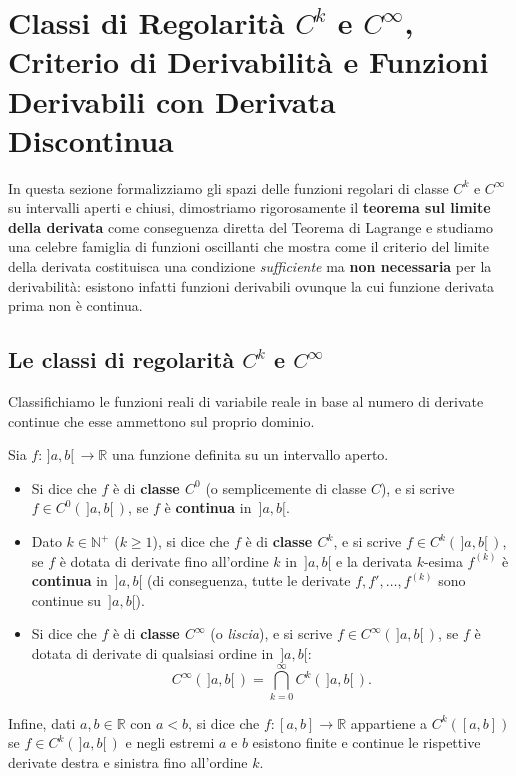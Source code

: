 \section{Classi di Regolarità $C^k$ e $C^\infty$, Criterio di Derivabilità e Funzioni Derivabili con Derivata Discontinua}

In questa sezione formalizziamo gli spazi delle funzioni regolari di classe $C^k$ e $C^\infty$ su intervalli aperti e chiusi, dimostriamo rigorosamente il \textbf{teorema sul limite della derivata} come conseguenza diretta del Teorema di Lagrange e studiamo una celebre famiglia di funzioni oscillanti che mostra come il criterio del limite della derivata costituisca una condizione \emph{sufficiente} ma \textbf{non necessaria} per la derivabilità: esistono infatti funzioni derivabili ovunque la cui funzione derivata prima non è continua.

\subsection{Le classi di regolarità $C^k$ e $C^\infty$}

Classifichiamo le funzioni reali di variabile reale in base al numero di derivate continue che esse ammettono sul proprio dominio.

\begin{defbox}
Sia $f \colon \,]a,b[\, \to \mathbb{R}$ una funzione definita su un intervallo aperto.
\begin{itemize}
    \item Si dice che $f$ è di \textbf{classe $C^0$} (o semplicemente di classe $C$), e si scrive $f \in C^0(\,]a,b[\,)$, se $f$ è \textbf{continua} in $\,]a,b[$.
    \item Dato $k \in \mathbb{N}^+$ ($k \ge 1$), si dice che $f$ è di \textbf{classe $C^k$}, e si scrive $f \in C^k(\,]a,b[\,)$, se $f$ è dotata di derivate fino all'ordine $k$ in $\,]a,b[$ e la derivata $k$-esima $f^{(k)}$ è \textbf{continua} in $\,]a,b[$ (di conseguenza, tutte le derivate $f, f', \dots, f^{(k)}$ sono continue su $\,]a,b[$).
    \item Si dice che $f$ è di \textbf{classe $C^\infty$} (o \emph{liscia}), e si scrive $f \in C^\infty(\,]a,b[\,)$, se $f$ è dotata di derivate di qualsiasi ordine in $\,]a,b[$:
    \[
        C^\infty(\,]a,b[\,) = \bigcap_{k=0}^{\infty} C^k(\,]a,b[\,).
    \]
\end{itemize}
Infine, dati $a, b \in \mathbb{R}$ con $a < b$, si dice che $f \colon [a,b] \to \mathbb{R}$ appartiene a \textbf{$C^k([a,b])$} se $f \in C^k(\,]a,b[\,)$ e negli estremi $a$ e $b$ esistono finite e continue le rispettive derivate destra e sinistra fino all'ordine $k$.
\end{defbox}

